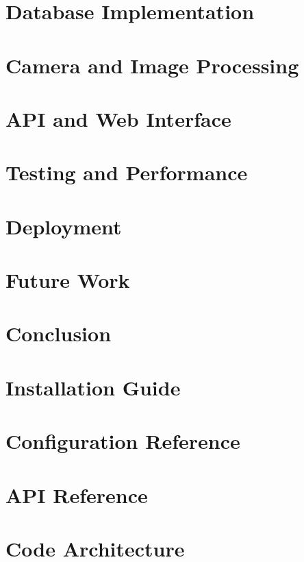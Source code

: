 \documentclass[12pt,a4paper]{report}
\begin{document}
\chapter{Database Implementation}


\chapter{Camera and Image Processing}


\chapter{API and Web Interface}


\chapter{Testing and Performance}


\chapter{Deployment}


\chapter{Future Work}


\chapter{Conclusion}


\appendix
\chapter{Installation Guide}


\chapter{Configuration Reference}


\chapter{API Reference}


\chapter{Code Architecture}




\end{document}
